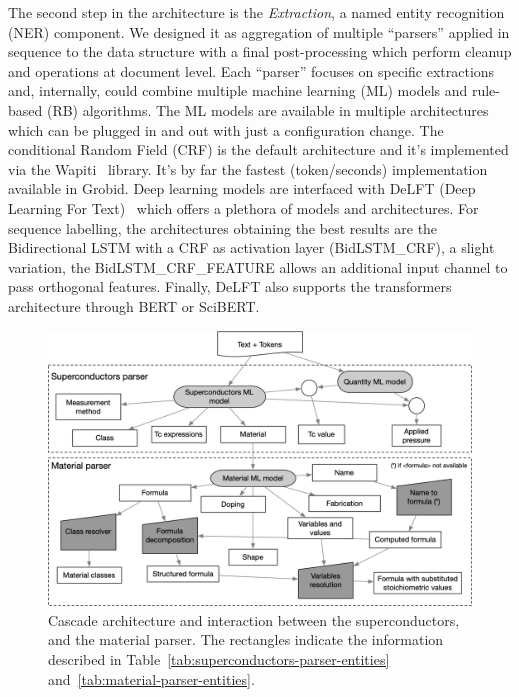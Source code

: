 \documentclass{article}
\begin{document}
The second step in the architecture is the \textit{Extraction}, a named entity recognition (NER) component.
We designed it as aggregation of multiple ``parsers'' applied in sequence to the data structure with a final post-processing which perform cleanup and operations at document level.
Each ``parser'' focuses on specific extractions and, internally, could combine multiple machine learning (ML) models and rule-based (RB) algorithms.
The ML models are available in multiple architectures which can be plugged in and out with just a configuration change. 
The conditional Random Field (CRF) is the default architecture and it's implemented via the Wapiti~\cite{lavergne2010practical} library. It's by far the fastest (token/seconds) implementation available in Grobid. 
Deep learning models are interfaced with DeLFT (Deep Learning For Text)~\cite{DeLFT} which offers a plethora of models and architectures. 
For sequence labelling, the architectures obtaining the best results are the Bidirectional LSTM with a CRF as activation layer (BidLSTM\_CRF), a slight variation, the BidLSTM\_CRF\_FEATURE allows an additional input channel to pass orthogonal features. 
Finally, DeLFT also supports the transformers architecture through BERT or SciBERT. 

\begin{figure}[ht]
\includegraphics[width=\textwidth]{extraction-schema-3}
\caption{\label{fig:extraction-ml-models-cascade-architecture} Cascade architecture and interaction between the superconductors, and the material parser. The rectangles indicate the information described in Table~\ref{tab:superconductors-parser-entities} and~\ref{tab:material-parser-entities}. }
\end{figure}
\end{document}
